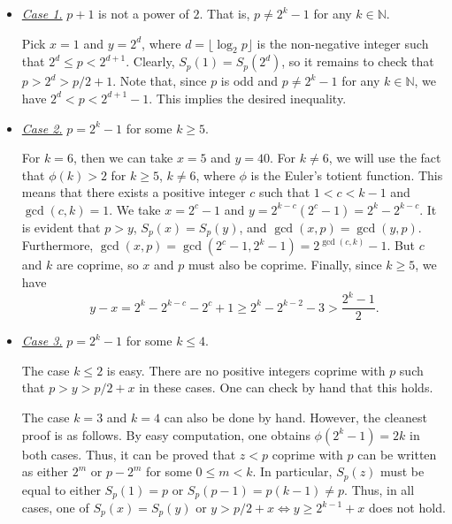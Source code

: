 \documentclass{article}
\newcommand{\N}{\mathbb{N}}
\begin{document}
\begin{itemize}

    \item
    \textit{\underline{Case 1.}}
    $p + 1$ is not a power of $2$.
    That is, $p \neq 2^k - 1$ for any $k \in \N$.

    Pick $x = 1$ and $y = 2^d$, where $d = \lfloor \log_2 p \rfloor$ is the non-negative integer such that $2^d \leq p < 2^{d + 1}$.
    Clearly, $S_p(1) = S_p(2^d)$, so it remains to check that $p > 2^d > p/2 + 1$.
    Note that, since $p$ is odd and $p \neq 2^k - 1$ for any $k \in \N$, we have $2^d < p < 2^{d + 1} - 1$.
    This implies the desired inequality.

    \item
    \textit{\underline{Case 2.}}
    $p = 2^k - 1$ for some $k \geq 5$.

    For $k = 6$, then we can take $x = 5$ and $y = 40$.
    For $k \neq 6$, we will use the fact that $\phi(k) > 2$ for $k \geq 5$, $k \neq 6$, where $\phi$ is the Euler's totient function.
    This means that there exists a positive integer $c$ such that $1 < c < k - 1$ and $\gcd(c, k) = 1$.
    We take $x = 2^c - 1$ and $y = 2^{k - c} (2^c - 1) = 2^k - 2^{k - c}$.
    It is evident that $p > y$, $S_p(x) = S_p(y)$, and $\gcd(x, p) = \gcd(y, p)$.
    Furthermore, $\gcd(x, p) = \gcd(2^c - 1, 2^k - 1) = 2^{\gcd(c, k)} - 1$.
    But $c$ and $k$ are coprime, so $x$ and $p$ must also be coprime.
    Finally, since $k \geq 5$, we have
    \[ y - x = 2^k - 2^{k - c} - 2^c + 1 \geq 2^k - 2^{k - 2} - 3 > \frac{2^k - 1}{2}. \]

    \item
    \textit{\underline{Case 3.}}
    $p = 2^k - 1$ for some $k \leq 4$.

    The case $k \leq 2$ is easy.
    There are no positive integers coprime with $p$ such that $p > y > p/2 + x$ in these cases.
    One can check by hand that this holds.

    The case $k = 3$ and $k = 4$ can also be done by hand.
    However, the cleanest proof is as follows.
    By easy computation, one obtains $\phi(2^k - 1) = 2k$ in both cases.
    Thus, it can be proved that $z < p$ coprime with $p$ can be written as either $2^m$ or $p - 2^m$ for some $0 \leq m < k$.
    In particular, $S_p(z)$ must be equal to either $S_p(1) = p$ or $S_p(p - 1) = p(k - 1) \neq p$.
    Thus, in all cases, one of $S_p(x) = S_p(y)$ or $y > p/2 + x \iff y \geq 2^{k - 1} + x$ does not hold.

\end{itemize}
\end{document}
